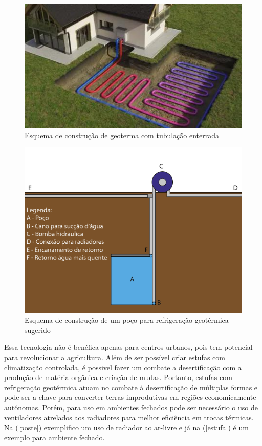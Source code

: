 \begin{figure}[ht]
    \centering
    \includegraphics[scale=0.7]{pictures/geoterma-padrao.jpeg}
    \caption{Esquema de construção de geoterma com tubulação enterrada}
    \label{geothermal-default}
\end{figure}

\begin{figure}[ht]
    \centering
    \includegraphics[scale=0.6]{pictures/geoterma.png}
    \caption{Esquema de construção de um poço para refrigeração geotérmica sugerido}
    \label{geothermal-new}
\end{figure}


Essa tecnologia não é benéfica apenas para centros urbanos, pois tem potencial para revolucionar a agricultura. Além de ser possível criar estufas com climatização controlada, é possivel fazer um combate a desertificação com a produção de matéria orgânica e criação de mudas. Portanto, estufas com refrigeração geotérmica atuam no combate à desertificação de múltiplas formas e pode ser a chave para converter terras improdutivas em regiões economicamente autônomas. Porém, para uso em ambientes fechados pode ser necessário o uso de ventiladores atrelados aos radiadores para melhor eficiência em trocas térmicas. Na (\autoref{poste}) exemplifico um uso de radiador ao ar-livre e já na (\autoref{estufa}) é um exemplo para ambiente fechado.

